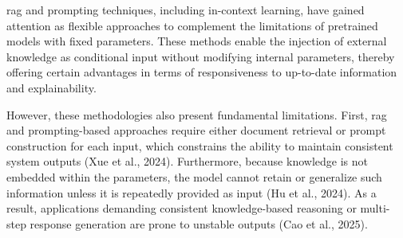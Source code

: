 \documentclass[a4paper,fleqn]{cas-sc}
\begin{document}
\gls{rag} and prompting techniques, including in-context learning, have gained attention as flexible approaches to complement the limitations of pretrained models with fixed parameters. These methods enable the injection of external knowledge as conditional input without modifying internal parameters, thereby offering certain advantages in terms of responsiveness to up-to-date information and explainability.

However, these methodologies also present fundamental limitations. First, \gls{rag} and prompting-based approaches require either document retrieval or prompt construction for each input, which constrains the ability to maintain consistent system outputs (Xue et al., 2024). Furthermore, because knowledge is not embedded within the parameters, the model cannot retain or generalize such information unless it is repeatedly provided as input (Hu et al., 2024). As a result, applications demanding consistent knowledge-based reasoning or multi-step response generation are prone to unstable outputs (Cao et al., 2025).
\end{document}
